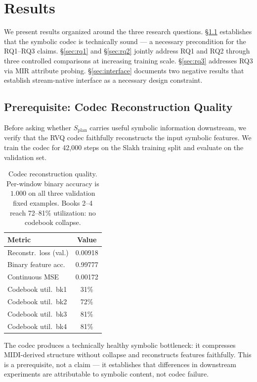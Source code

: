 \documentclass[11pt]{article}
\newcommand{\splan}{$S_{\mathrm{plan}}$}
\begin{document}
\section{Results}

We present results organized around the three research questions.
\S\ref{sec:codec} establishes that the symbolic codec is technically sound --- a
necessary precondition for the RQ1--RQ3 claims.
\S\ref{sec:rq1} and \S\ref{sec:rq2} jointly address RQ1 and RQ2 through three
controlled comparisons at increasing training scale.
\S\ref{sec:rq3} addresses RQ3 via MIR attribute probing.
\S\ref{sec:interface} documents two negative results that establish stream-native
interface as a necessary design constraint.

\subsection{Prerequisite: Codec Reconstruction Quality}
\label{sec:codec}

Before asking whether \splan{} carries useful symbolic information downstream, we verify
that the RVQ codec faithfully reconstructs the input symbolic features.
We train the codec for 42{,}000 steps on the Slakh training split and evaluate on the
validation set.

\begin{table}[h]
\centering
\small
\begin{tabular}{lc}
\toprule
Metric & Value \\
\midrule
Reconstr.\ loss (val.) & 0.00918 \\
Binary feature acc.    & 0.99777 \\
Continuous MSE         & 0.00172 \\
Codebook util.\ bk1   & 31\%    \\
Codebook util.\ bk2   & 72\%    \\
Codebook util.\ bk3   & 81\%    \\
Codebook util.\ bk4   & 81\%    \\
\bottomrule
\end{tabular}
\caption{Codec reconstruction quality.  Per-window binary accuracy is $1.000$ on all
  three validation fixed examples.  Books 2--4 reach 72--81\% utilization: no codebook collapse.}
\label{tab:codec}
\end{table}

The codec produces a technically healthy symbolic bottleneck: it compresses
MIDI-derived structure without collapse and reconstructs features faithfully.
This is a prerequisite, not a claim --- it establishes that differences in downstream
experiments are attributable to symbolic content, not codec failure.
\end{document}
